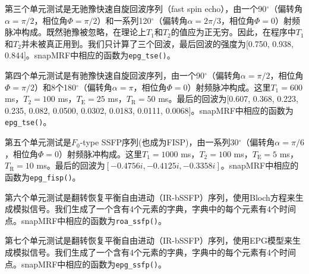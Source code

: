 第三个单元测试是无驰豫快速自旋回波序列（fast spin echo），由一个90$^{\circ}$（偏转角$\alpha = \pi/2$，相位角$\Phi = \pi/2$）和一系列120$^{\circ}$（偏转角$\alpha = 2\pi/3$，相位角$\Phi = 0$）射频脉冲构成。既然驰豫被忽略，在理论上$T_1$和$T_2$的值应为正无穷。因此，在程序中$T_1$和$T_2$并未被真正用到。我们只计算了三个回波，最后回波的强度为$[$0.750, 0.938, 0.844$]$。snapMRF中相应的函数为\texttt{epg\_tse()}。

第四个单元测试是有驰豫快速自旋回波序列，由一个90$^{\circ}$（偏转角$\alpha = \pi/2$，相位角$\Phi = \pi/2$）和8个180$^{\circ}$（偏转角$\alpha = \pi$，相位角$\Phi = 0$）射频脉冲构成。这里$T_1 = 600$ ms，$T_2 = 100$ ms，$T_\mathrm{E} = 25$ ms，$T_\mathrm{R} = 50$ ms。最后的回波为$[$0.607, 0.368, 0.223, 0.235, 0.082, 0.0500, 0.0302, 0.0183, 0.0111, 0.0068$]$。snapMRF中相应的函数为\texttt{epg\_tse()}。

第五个单元测试是$F_0$-type SSFP序列(也成为FISP)，由一系列30$^{\circ}$（偏转角$\alpha = \pi/6$，相位角$\Phi = 0$）射频脉冲构成。这里$T_1 = 1000$ ms，$T_2 = 100$ ms，$T_\mathrm{E} = 5$ ms，$T_\mathrm{R} = 10$ ms。最后的回波为$[-0.4756i, -0.4125i, -0.3358i]$。snapMRF中相应的函数为\texttt{epg\_fisp()}。

第六个单元测试是翻转恢复平衡自由进动（IR-bSSFP）序列，使用Bloch方程来生成模拟信号。我们生成了一个含有4个元素的字典，字典中的每个元素有4个时间点。snapMRF中相应的函数为\texttt{roa\_ssfp()}。

第七个单元测试是翻转恢复平衡自由进动（IR-bSSFP）序列，使用EPG模型来生成模拟信号。我们生成了一个含有4个元素的字典，字典中的每个元素有4个时间点。snapMRF中相应的函数为\texttt{epg\_ssfp()}。

